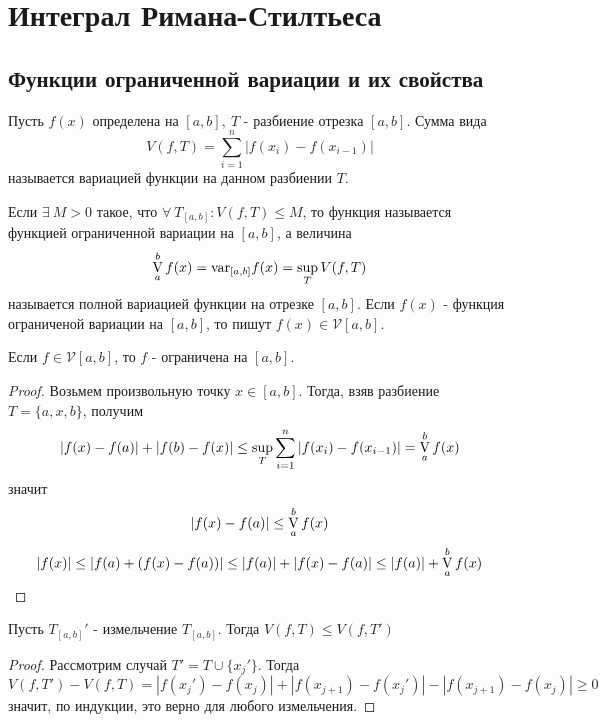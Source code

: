 \newpage
\section{Интеграл Римана-Стилтьеса}
\subsection{Функции ограниченной вариации и их свойства}
\begin{definition}
    Пусть $f(x)$ определена на $[a,b],\ T$ - разбиение отрезка $[a,b]$. Сумма вида 
    \[V(f,T)=\sum\limits_{i=1}^{n}|f(x_i)-f(x_{i-1})|\]
    называется вариацией функции на данном разбиении $T$.
\end{definition} 
\begin{definition}
    Если $\exists\ M>0$ такое, что $\forall\ T_{[a,b]}: V(f,T)\leq M$, то функция называется функцией ограниченной вариации на $[a,b]$, а величина
    \[\operatorname*{V}\limits_{a}^{b} f(x)=\text{var}_{[a,b]}f(x)=\sup\limits_{T}V(f,T)\] %
    называется полной вариацией функции на отрезке $[a,b]$. Если $f(x)$ - функция ограниченой вариации на $[a,b]$, то пишут $f(x)\in \mathcal{V}[a,b]$.
\end{definition} 
\begin{numtheorem}
    Если $f\in \mathcal{V}[a,b]$, то $f$ - ограничена на $[a,b]$.
\end{numtheorem}
\begin{proof}
    Возьмем произвольную точку $x\in [a,b]$. Тогда, взяв разбиение $T=\{a,x,b\}$, получим
    \[|f(x)-f(a)|+|f(b)-f(x)|\leq\sup\limits_{T}\sum\limits_{i=1}^{n}|f(x_i)-f(x_{i-1})|=\operatorname*{V}\limits_{a}^{b}f(x)\]
    значит 
    \[|f(x)-f(a)|\leq \operatorname*{V}\limits_{a}^{b}f(x)\]
    \[|f(x)|\leq |f(a)+(f(x)-f(a))|\leq |f(a)|+|f(x)-f(a)|\leq |f(a)|+\operatorname*{V}\limits_{a}^{b}f(x)\]
\end{proof}
\begin{numtheorem}
    Пусть $T_{[a,b]}'$ - измельчение $T_{[a,b]}$. Тогда $V(f, T)\leq V(f, T')$
\end{numtheorem} 
\begin{proof}
    Рассмотрим случай $T'=T\cup \{x_j'\}$. Тогда
    \[V(f,T')-V(f,T)=|f(x_j')-f(x_j)|+|f(x_{j+1})-f(x_j')|-|f(x_{j+1})-f(x_j)|\geq 0\]
    значит, по индукции, это верно для любого измельчения.
\end{proof} 
